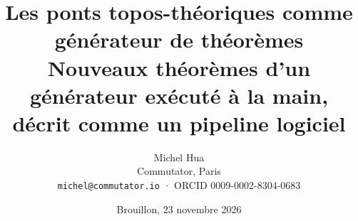 \documentclass[11pt]{article}
\title{Les ponts topos-théoriques comme générateur de théorèmes\\[0.3em] \large Nouveaux théorèmes d'un générateur exécuté à la main, décrit comme un pipeline logiciel}
\author{Michel Hua\\ \small Commutator, Paris\\ \small\texttt{michel@commutator.io} · ORCID 0009-0002-8304-0683}
\date{Brouillon, 23 novembre 2026}
\begin{document}
\maketitle

\tableofcontents
\newpage













\appendix


\begin{english}\renewcommand{\refname}{Références}

\end{english}
\end{document}
